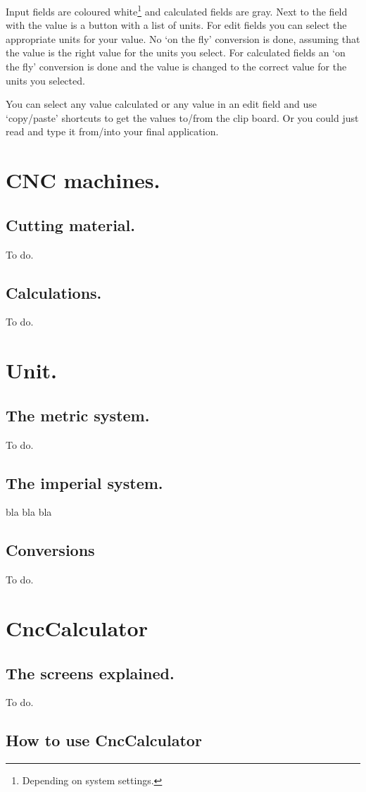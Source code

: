\documentclass[10pt,a4paper,twoside]{report}
\newcommand{\CC}{CncCalculator}
\begin{document}
    Input fields are coloured white\footnote{Depending on system settings.} and calculated fields are gray.
    Next to the field with the value is a button with a list of units. For edit fields you can select
    the appropriate units for your value. No `on the fly' conversion is done, assuming that the value
    is the right value for the units you select. For calculated fields an `on the fly' conversion is
    done and the value is changed to the correct value for the units you selected.
    
	You can select any value calculated or any value in an edit field and use `copy/paste' shortcuts
	to get the values to/from the clip board. Or you could just read and type it from/into your final
	application.
	
	\chapter{CNC machines.}
	\section{Cutting material.}
	To do.
		
	\section{Calculations.}
    To do.
	
	\chapter{Unit.}
	\section{The metric system.}
	To do.
	
	\section{The imperial system.}
	bla bla bla
	
	\section {Conversions}
	To do.
	
	\chapter{\CC}
	\section{The screens explained.}
	To do.
	
	\section{How to use \CC}
\newpage{} 
{}
%    
\end{document}
